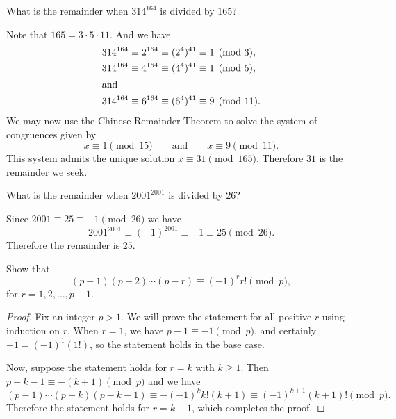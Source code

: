  What is the remainder when $314^{164}$ is divided by $165$?
\begin{solution}
  Note that $165 = 3\cdot5\cdot11$. And we have
  \begin{align*}
    314^{164}\equiv2^{164}\equiv(2^4)^{41} &\equiv 1\pmod3, \\
    314^{164}\equiv4^{164}\equiv(4^4)^{41} &\equiv 1\pmod5, \\
    \intertext{and}
    314^{164}\equiv6^{164}\equiv(6^4)^{41} &\equiv 9\pmod{11}.
  \end{align*}
  We may now use the Chinese Remainder Theorem to solve the system of
  congruences given by
  \begin{equation*}
    x \equiv 1\pmod{15} \qquad\text{and}\qquad x \equiv 9 \pmod{11}.
  \end{equation*}
  This system admits the unique solution
  $x\equiv31\pmod{165}$. Therefore $31$ is the remainder we seek.
\end{solution}

 What is the remainder when $2001^{2001}$ is divided by $26$?
\begin{solution}
  Since $2001\equiv25\equiv-1\pmod{26}$ we have
  \begin{equation*}
    2001^{2001}\equiv(-1)^{2001}\equiv-1\equiv25\pmod{26}.
  \end{equation*}
  Therefore the remainder is $25$.
\end{solution}

 Show that
\begin{equation*}
  (p - 1)(p - 2)\cdots(p - r) \equiv (-1)^rr!\pmod p,
\end{equation*}
for $r = 1, 2, \dots, p - 1$.
\begin{proof}
  Fix an integer $p > 1$. We will prove the statement for all positive
  $r$ using induction on $r$. When $r = 1$, we have
  $p - 1 \equiv -1 \pmod{p}$, and certainly $-1 = (-1)^1(1!)$, so the
  statement holds in the base case.

  Now, suppose the statement holds for $r = k$ with
  $k\geq1$. Then $p - k - 1\equiv -(k + 1)\pmod{p}$ and we have
  \begin{equation*}
    (p - 1)\cdots(p - k)(p - k - 1)
    \equiv-(-1)^kk!(k + 1) \equiv (-1)^{k+1}(k+1)!\pmod{p}.
  \end{equation*}
  Therefore the statement holds for $r = k + 1$, which completes the
  proof.
\end{proof}
